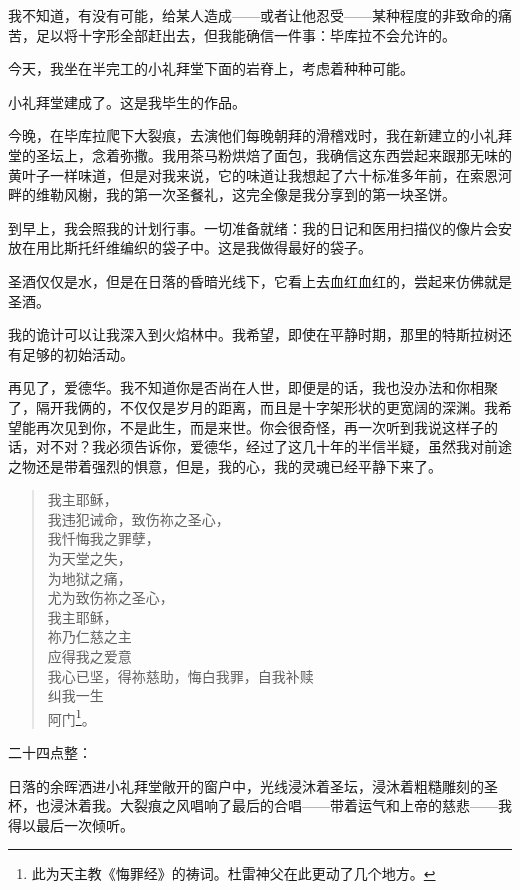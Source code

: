 \documentclass[AutoFakeBold=true]{book}
\begin{document}
我不知道，有没有可能，给某人造成——或者让他忍受——某种程度的非致命的痛苦，足以将十字形全部赶出去，但我能确信一件事：毕库拉不会允许的。

今天，我坐在半完工的小礼拜堂下面的岩脊上，考虑着种种可能。

\vspace*{1em}{\kaishu 第四百三十八日：}

小礼拜堂建成了。这是我毕生的作品。

今晚，在毕库拉爬下大裂痕，去演他们每晚朝拜的滑稽戏时，我在新建立的小礼拜堂的圣坛上，念着弥撒。我用茶马粉烘焙了面包，我确信这东西尝起来跟那无味的黄叶子一样味道，但是对我来说，它的味道让我想起了六十标准多年前，在索恩河畔的维勒风榭，我的第一次圣餐礼，这完全像是我分享到的第一块圣饼。

到早上，我会照我的计划行事。一切准备就绪：我的日记和医用扫描仪的像片会安放在用比斯托纤维编织的袋子中。这是我做得最好的袋子。

圣酒仅仅是水，但是在日落的昏暗光线下，它看上去血红血红的，尝起来仿佛就是圣酒。

我的诡计可以让我深入到火焰林中。我希望，即使在平静时期，那里的特斯拉树还有足够的初始活动。

再见了，爱德华。我不知道你是否尚在人世，即便是的话，我也没办法和你相聚了，隔开我俩的，不仅仅是岁月的距离，而且是十字架形状的更宽阔的深渊。我希望能再次见到你，不是此生，而是来世。你会很奇怪，再一次听到我说这样子的话，对不对？我必须告诉你，爱德华，经过了这几十年的半信半疑，虽然我对前途之物还是带着强烈的惧意，但是，我的心，我的灵魂已经平静下来了。

\begin{quote}
	{\kaishu 我主耶稣，\\
	我违犯诫命，致伤祢之圣心，\\
	我忏悔我之罪孽，\\
	为天堂之失，\\
	为地狱之痛，\\
	尤为致伤祢之圣心，\\
	我主耶稣，\\
	祢乃仁慈之主\\
	应得我之爱意\\
	我心已坚，得祢慈助，悔白我罪，自我补赎\\
	纠我一生\\
	阿门}\footnote{此为天主教《悔罪经》的祷词。杜雷神父在此更动了几个地方。}。
\end{quote}

二十四点整：

日落的余晖洒进小礼拜堂敞开的窗户中，光线浸沐着圣坛，浸沐着粗糙雕刻的圣杯，也浸沐着我。大裂痕之风唱响了最后的合唱——带着运气和上帝的慈悲——我得以最后一次倾听。
\end{document}
